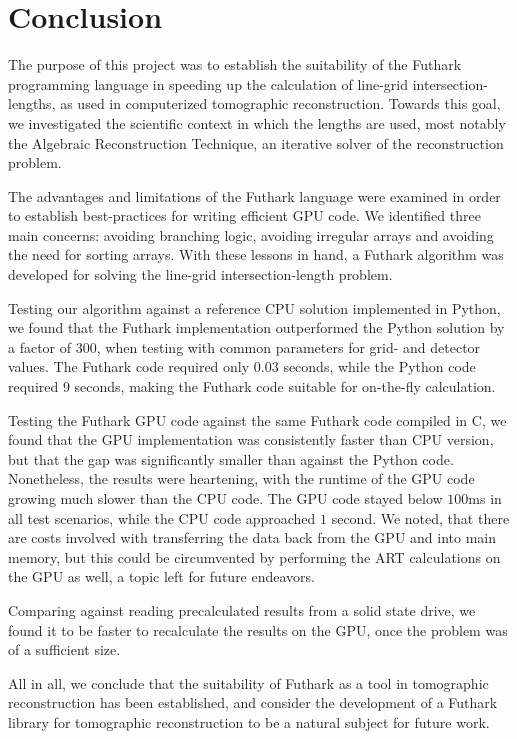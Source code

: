 \section{Conclusion}
The purpose of this project was to establish the suitability of the Futhark programming language in speeding up the  calculation of line-grid intersection-lengths, as used in computerized tomographic reconstruction. Towards this goal, we investigated the scientific context in which the lengths are used, most notably the Algebraic Reconstruction Technique, an iterative solver of the reconstruction problem.

The advantages and limitations of the Futhark language were examined in order to establish best-practices for writing efficient GPU code. We identified three main concerns: avoiding branching logic, avoiding irregular arrays and avoiding the need for sorting arrays. With these lessons in hand, a Futhark algorithm was developed for solving the line-grid intersection-length problem.

Testing our algorithm against a reference CPU solution implemented in Python, we found that the Futhark implementation outperformed the Python solution by a factor of $300$, when testing with common parameters for grid- and detector values. The Futhark code required only $0.03$ seconds, while the Python code required 9 seconds, making the Futhark code suitable for on-the-fly calculation.

Testing the Futhark GPU code against the same Futhark code compiled in C, we found that the GPU implementation was consistently faster than CPU version, but that the gap was significantly smaller than against the Python code. Nonetheless, the results were heartening, with the runtime of the GPU code growing much slower than the CPU code. The GPU code stayed below $100$ms in all test scenarios, while the CPU code approached $1$ second. We noted, that there are costs involved with transferring the data back from the GPU and into main memory, but this could be circumvented by performing the ART calculations on the GPU as well, a topic left for future endeavors.

Comparing against reading precalculated results from a solid state drive, we found it to be faster to recalculate the results on the GPU, once the problem was of a sufficient size.

All in all, we conclude that the suitability of Futhark as a tool in tomographic reconstruction has been established, and consider the development of a Futhark library for tomographic reconstruction to be a natural subject for future work. 



